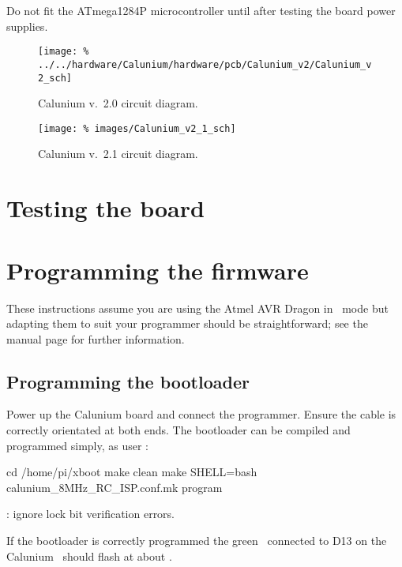 Do not fit the ATmega1284P microcontroller until after testing the
board power supplies.

\begin{landscape}
  \begin{figure}[p]
    \centering
    \texttt{[image: \%
      ../../hardware/Calunium/hardware/pcb/Calunium\_v2/Calunium\_v2\_sch]}  
    \caption{Calunium v.~2.0 circuit diagram.}
    \label{fig:calunium-v2.0-cct-diag}
  \end{figure}
  \begin{figure}[p]
    \centering
    \texttt{[image: \%
      images/Calunium\_v2\_1\_sch]}
    \caption{Calunium v.~2.1 circuit diagram.}
    \label{fig:calunium-v2.1-cct-diag}
  \end{figure}
\end{landscape}

\section{Testing the board}

\section{Programming the firmware}

These instructions assume you are using the Atmel AVR Dragon in \isp\
mode but adapting them to suit your programmer should be
straightforward; see the  manual page for further
information.

\subsection{Programming the bootloader}

Power up the Calunium board and connect the programmer. Ensure the
cable is correctly orientated at both ends. The bootloader can be
compiled and programmed simply, as user \piUser: \todo[Check directory]
\begin{Cmd}
  cd /home/pi/xboot
  make clean
  make SHELL=bash calunium_8MHz_RC_ISP.conf.mk program
\end{Cmd}
\todo: ignore lock bit verification errors.

If the bootloader is correctly programmed the green \led\ connected to
D13 on the Calunium \pcb\ should flash at about \Hz{1}.

